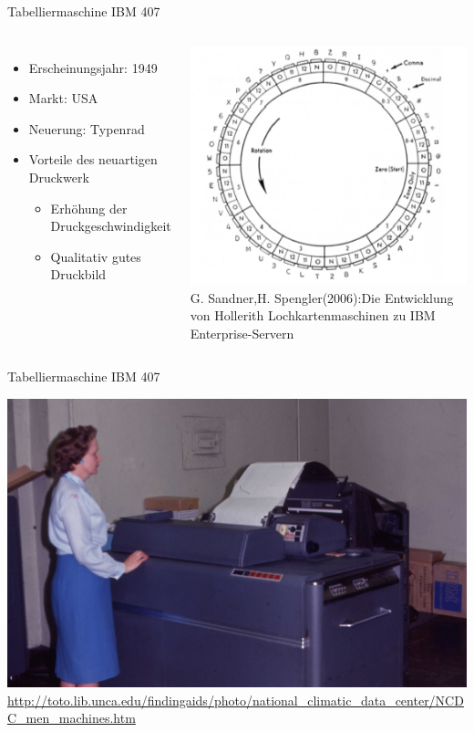 \documentclass[EU2]{beamer}
\begin{document}
\begin{frame}{Tabelliermaschine IBM 407}
   \begin{columns}
    \begin{itemize}
      \item Erscheinungsjahr: 1949
      \item Markt: USA
      \item Neuerung: Typenrad
      \item Vorteile des neuartigen Druckwerk
      	\begin{itemize}
          \item Erhöhung der Druckgeschwindigkeit
          \item Qualitativ gutes Druckbild
       \end{itemize}
    \end{itemize}
      \includegraphics[height=0.4\textheight]{typenrad}\\
      \tiny{G. Sandner,H. Spengler(2006):Die Entwicklung von Hollerith Lochkartenmaschinen zu IBM Enterprise-Servern}
  \end{columns}
\end{frame}

\begin{frame}{Tabelliermaschine IBM 407}
\begin{center}
    \includegraphics[height=0.9\textheight]{IBM 407}\\
    \tiny{\url{http://toto.lib.unca.edu/findingaids/photo/national_climatic_data_center/NCDC_men_machines.htm}}
  \end{center}
\end{frame}
\end{document}
